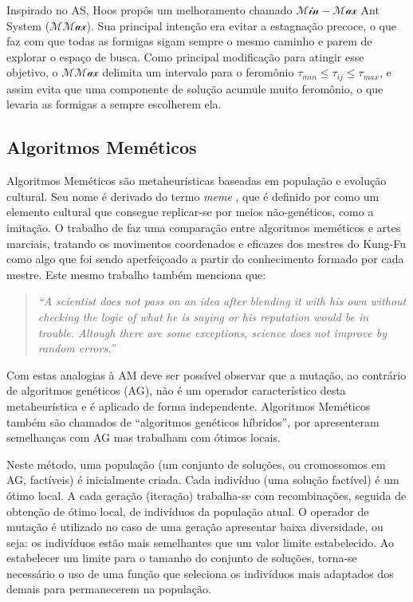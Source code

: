 Inspirado no AS, Hoos \cite{mmas-origin} propôs um melhoramento chamado
$\mathcal{Min-Max}$ Ant System ($\mathcal{MMax}$). Sua principal intenção
era evitar a estagnação precoce, o que faz com que todas as formigas sigam
sempre o mesmo caminho e parem de explorar o espaço de busca. Como principal
modificação para atingir esse objetivo, o $\mathcal{MMax}$ delimita um
intervalo para o feromônio $\tau_{min} \le \tau_{ij} \le \tau_{max}$,
e assim evita que uma componente de solução acumule muito feromônio, %
o que levaria as formigas a sempre escolherem ela.

\subsection{Algoritmos Meméticos}

Algoritmos Meméticos \cite{moscato1} são metaheurísticas baseadas
em população e evolução cultural.
Seu nome é derivado do termo \textit{meme} \cite{dawkins}, que é
definido por \cite{oxford-dict} como um elemento cultural que consegue
replicar-se por meios não-genéticos, como a imitação.
O trabalho de \cite{moscato1} faz uma comparação entre algoritmos
meméticos e artes marciais, tratando os movimentos coordenados e
eficazes dos mestres do Kung-Fu como algo que foi sendo aperfeiçoado
a partir do conhecimento formado por cada mestre. Este mesmo trabalho
também menciona que:
\begin{quote}
\textit{``A scientist does not pass on an idea after blending it with
  his own without checking the logic of what he is saying or his
  reputation would be in trouble. Altough there are some
  exceptions, science does not improve by random errors.''}
\end{quote}
Com estas analogias à AM deve ser possível observar que a mutação, ao
contrário de algoritmos genéticos (AG), não é um operador
característico desta metaheurística e é aplicado de forma
independente. Algoritmos Meméticos também são chamados de ``algoritmos
genéticos híbridos'', por apresenteram semelhanças com AG mas
trabalham com ótimos locais.

Neste método, uma população (um conjunto de soluções, ou cromossomos
em AG, factíveis) é
inicialmente criada. Cada indivíduo (uma solução factível) é um ótimo
local. A cada geração (iteração) trabalha-se com recombinações,
seguida de obtenção de ótimo local, de indivíduos da população
atual. O operador de mutação é utilizado no caso de uma
geração apresentar baixa diversidade, ou seja: os indivíduos estão
mais semelhantes que um valor limite estabelecido.
Ao estabelecer um limite para o tamanho do conjunto de soluções,
torna-se necessário o uso de uma função que seleciona os indivíduos
mais adaptados dos demais para permanecerem na população.

